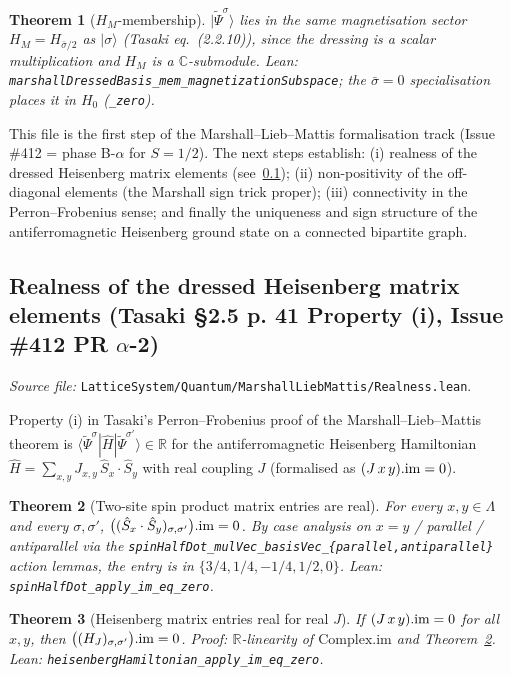 \documentclass[a4paper,11pt]{article}
\newtheorem{theorem}{Theorem}
\begin{document}
\begin{theorem}[$H_M$-membership]
\label{thm:marshall-dressed-hm}
$|\widetilde{\Psi}^\sigma\rangle$ lies in the same magnetisation
sector $H_M = H_{\bar\sigma/2}$ as $|\sigma\rangle$ (Tasaki
eq.~(2.2.10)), since the dressing is a scalar multiplication and
$H_M$ is a $\mathbb{C}$-submodule.  Lean:
\texttt{marshallDressedBasis\_mem\_magnetizationSubspace}; the
$\bar\sigma = 0$ specialisation places it in $H_0$
(\texttt{\_zero}).
\end{theorem}

This file is the first step of the Marshall--Lieb--Mattis
formalisation track (Issue \#412 = phase B-$\alpha$ for $S = 1/2$).
The next steps establish:
(i) realness of the dressed Heisenberg matrix elements
(see~\ref{ssec:mlm-realness});
(ii) non-positivity of the off-diagonal elements (the
Marshall sign trick proper);
(iii) connectivity in the Perron--Frobenius sense; and finally
the uniqueness and sign structure of the antiferromagnetic
Heisenberg ground state on a connected bipartite graph.

\subsection{Realness of the dressed Heisenberg matrix elements
(Tasaki §2.5 p. 41 Property (i), Issue \#412 PR $\alpha$-2)}
\label{ssec:mlm-realness}

\emph{Source file:}
\texttt{LatticeSystem/Quantum/MarshallLiebMattis/Realness.lean}.

Property (i) in Tasaki's Perron--Frobenius proof of the
Marshall--Lieb--Mattis theorem is
$\langle \widetilde{\Psi}^\sigma | \hat H |
 \widetilde{\Psi}^{\sigma'}\rangle \in \mathbb{R}$
for the antiferromagnetic Heisenberg Hamiltonian
$\hat H = \sum_{x,y} J_{x,y}\,\hat S_x \cdot \hat S_y$ with real
coupling $J$ (formalised as $(J\,x\,y).{\rm im} = 0$).

\begin{theorem}[Two-site spin product matrix entries are real]
\label{thm:spinHalfDot-real}
For every $x, y \in \Lambda$ and every $\sigma, \sigma'$,
$\big((\hat S_x \cdot \hat S_y)_{\sigma,\sigma'}\big).{\rm im} = 0$.
By case analysis on $x = y$ / parallel / antiparallel via the
\texttt{spinHalfDot\_mulVec\_basisVec\_\{parallel,antiparallel\}}
action lemmas, the entry is in $\{3/4, 1/4, -1/4, 1/2, 0\}$.
Lean: \texttt{spinHalfDot\_apply\_im\_eq\_zero}.
\end{theorem}

\begin{theorem}[Heisenberg matrix entries real for real $J$]
\label{thm:heisenberg-real}
If $(J\,x\,y).{\rm im} = 0$ for all $x, y$, then
$\big((H_J)_{\sigma,\sigma'}\big).{\rm im} = 0$.  Proof:
$\mathbb{R}$-linearity of $\mathrm{Complex.im}$ and
Theorem~\ref{thm:spinHalfDot-real}.  Lean:
\texttt{heisenbergHamiltonian\_apply\_im\_eq\_zero}.
\end{theorem}
\end{document}
